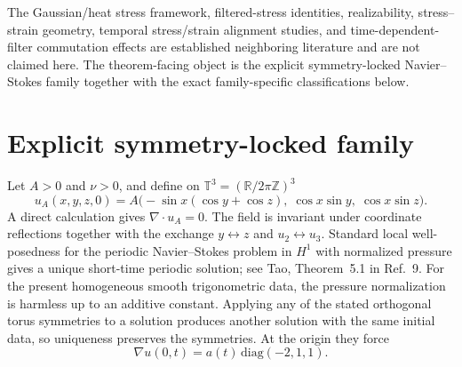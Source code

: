 \documentclass[11pt,a4paper]{article}
\newcommand{\R}{\mathbb{R}}
\newcommand{\T}{\mathbb{T}}
\begin{document}
The Gaussian/heat stress framework, filtered-stress identities, realizability, stress--strain geometry, temporal stress/strain alignment studies, and time-dependent-filter commutation effects are established neighboring literature and are not claimed here. The theorem-facing object is the explicit symmetry-locked Navier--Stokes family together with the exact family-specific classifications below.

\section{Explicit symmetry-locked family}
Let $A>0$ and $\nu>0$, and define on $\T^3=(\R/2\pi\mathbb Z)^3$
\begin{equation}
 u_A(x,y,z,0)=A\bigl(-\sin x(\cos y+\cos z),\;\cos x\sin y,\;\cos x\sin z\bigr).
 \label{eq:uA}
\end{equation}
A direct calculation gives $\nabla\cdot u_A=0$. The field is invariant under coordinate reflections together with the exchange $y\leftrightarrow z$ and $u_2\leftrightarrow u_3$. Standard local well-posedness for the periodic Navier--Stokes problem in $H^1$ with normalized pressure gives a unique short-time periodic solution; see Tao, Theorem~5.1 in Ref.~9. For the present homogeneous smooth trigonometric data, the pressure normalization is harmless up to an additive constant. Applying any of the stated orthogonal torus symmetries to a solution produces another solution with the same initial data, so uniqueness preserves the symmetries. At the origin they force
\begin{equation}
 \nabla u(0,t)=a(t)\,\mathrm{diag}(-2,1,1).
 \label{eq:gradshape}
\end{equation}
\end{document}
